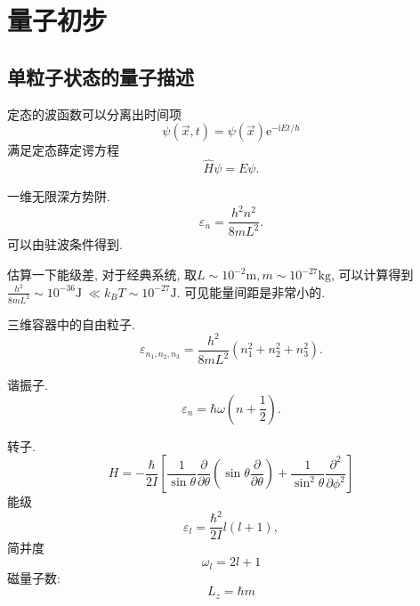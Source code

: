 
\section{量子初步}

\subsection{单粒子状态的量子描述}
定态的波函数可以分离出时间项
\begin{equation}
  \psi(\vec{x},t) = \psi(\vec{x}) \mathrm{e}^{-\mathrm{i} E t / \hbar}
\end{equation}
满足定态薛定谔方程
\begin{equation}
  \hat{H}\psi = E \psi.
\end{equation}

\begin{example}
    一维无限深方势阱.
    \begin{equation}
      \varepsilon_n = \frac{h^2 n^2}{8m L^2}.
    \end{equation}
    可以由驻波条件得到.

    估算一下能级差, 对于经典系统, 取$L\sim 10^{-2}\text{m}, m\sim 10^{-27}\text{kg}$, 可以计算得到$\frac{h^2}{8mL^2} \sim 10^{-36}\text{J} \ \ll k_B T \sim 10^{-27}\text{J}$.
    可见能量间距是非常小的.
\end{example}

\begin{example}
    三维容器中的自由粒子.
    \begin{equation}
        \varepsilon_{n_1,n_2,n_3} = \frac{h^2}{8m L^2}(n_1^2 + n_2^2 + n_3^2).
      \end{equation}
\end{example}

\begin{example}
    谐振子.
    \begin{equation}
      \varepsilon_n = \hbar \omega \left( n+ \frac{1}{2} \right) .
    \end{equation}
\end{example}

\begin{example}
    转子.
    \begin{equation}
      H = -\frac{\hbar}{2I}\left[ \frac{1}{\sin\theta} \frac{\partial }{\partial \theta} \left( \sin\theta \frac{\partial }{\partial \theta} \right) + \frac{1}{\sin^2 \theta} \frac{\partial^2 }{\partial \phi^2} \right] 
    \end{equation}
    能级
    \begin{equation}
      \varepsilon_l = \frac{\hbar^2}{2I}l(l+1),
    \end{equation}
    简并度
    \begin{equation}
      \omega_l = 2l +1
    \end{equation}
    磁量子数:
    \begin{equation}
      L_z  = \hbar m
    \end{equation}
\end{example}

